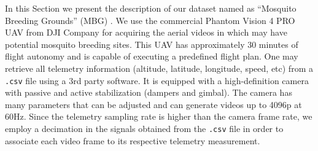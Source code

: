 %
In this Section we present the description of our dataset named as ``Mosquito Breeding Grounds'' (MBG) .
We use the commercial Phantom Vision 4 PRO UAV from DJI Company for acquiring the aerial videos in which may have potential mosquito breeding sites.
%
This UAV has approximately 30 minutes of flight autonomy and is capable of executing a predefined flight plan.
One may retrieve all telemetry information (\eg altitude, latitude, longitude, speed, etc) from a \verb|.csv| file using a 3rd party software.
It is equipped with a high-definition camera with passive and active stabilization (dampers and gimbal).
%
The camera has many parameters that can be adjusted and can generate videos up to 4096p at 60Hz.
%
Since the telemetry sampling rate is higher than the camera frame rate, we employ a decimation in the signals obtained from the \verb|.csv| file in order to associate each video frame to its respective telemetry measurement.
%

